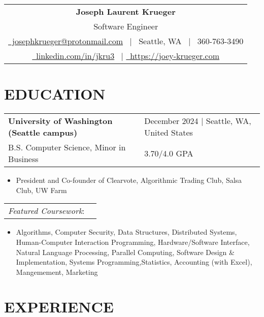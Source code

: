 \documentclass[10.5pt,letterpaper]{article}
\makeatletter
\newcommand{\header}[1]{
    \noindent
    \begin{tabularx}{\linewidth}{@{} C @{}}
        \Huge\textbf{Joseph Laurent Krueger} \\[5pt]
        {\Large #1} \\[5pt]
        \href{mailto:josephfkrueger@protonmail.com}{{\color{primarycolor}\faEnvelope}\ josephkrueger@protonmail.com} \ $|$ 
        {{\color{primarycolor}\faMapPin}\ Seattle, WA} \ $|$ 
        {{\color{primarycolor}\faMobile}\ 360-763-3490} \\[3pt]
        \href{https://linkedin.com/in/jkru3}{{\color{primarycolor}\faLinkedin}\ linkedin.com/in/jkru3} \ $|$ 
        \href{https://joey-krueger.com}{{\color{primarycolor}\faGlobeAmericas}\ https://joey-krueger.com}
    \end{tabularx}
}
\newcommand{\educationentry}[5]{
    \begin{tabularx}{\textwidth}{lX}
        \textbf{#1} & \hfill {\textcolor{primarycolor}{#3}} $|$ #4 \\[0pt]
        #2 & \hfill #5 \\[0pt]
    \end{tabularx}
}
\makeatother
\begin{document}
\header{Software Engineer}
\vspace{-10pt}

\section{\faGraduationCap{ }EDUCATION}
\vspace{4pt}
\educationentry{University of Washington (Seattle campus)}{B.S. Computer Science, Minor in Business}{December 2024}{Seattle, WA, United States}{3.70/4.0 GPA}
\begin{itemize}[leftmargin=1.5em, nosep, noitemsep] %
  \item[] President and Co-founder of Clearvote, Algorithmic Trading Club, Salsa Club, UW Farm
\end{itemize}
\begin{tabularx}{\textwidth}{lX}
  \textit{Featured Coursework}: & \\ 
\end{tabularx}
\begin{itemize}[leftmargin=1.5em, nosep, noitemsep] %
  \item[] Algorithms, Computer Security, Data Structures, Distributed Systems, Human-Computer Interaction Programming, Hardware/Software Interface, Natural Language Processing, Parallel Computing, Software Design \& Implementation, Systems Programming,Statistics, Accounting (with Excel), Mangemement, Marketing \\
\end{itemize}
\vspace{-30pt}

\section{\faCode{ }EXPERIENCE}
\vspace{4pt}




\vspace{-10pt}
\end{document}
